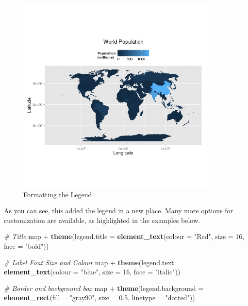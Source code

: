 \documentclass[]{article}
\newenvironment{Shaded}{}{}
\newcommand{\KeywordTok}[1]{\textcolor[rgb]{0.00,0.44,0.13}{\textbf{{#1}}}}
\newcommand{\DataTypeTok}[1]{\textcolor[rgb]{0.56,0.13,0.00}{{#1}}}
\newcommand{\DecValTok}[1]{\textcolor[rgb]{0.25,0.63,0.44}{{#1}}}
\newcommand{\FloatTok}[1]{\textcolor[rgb]{0.25,0.63,0.44}{{#1}}}
\newcommand{\StringTok}[1]{\textcolor[rgb]{0.25,0.44,0.63}{{#1}}}
\newcommand{\CommentTok}[1]{\textcolor[rgb]{0.38,0.63,0.69}{\textit{{#1}}}}
\newcommand{\NormalTok}[1]{{#1}}
\let\Oldincludegraphics\includegraphics
\renewcommand{\includegraphics}[1]{\Oldincludegraphics[width=10cm]{#1}}
\begin{document}
\begin{figure}[htbp]
\centering
\includegraphics{figure/Formatting_the_Legend.png}
\caption{Formatting the Legend}
\end{figure}

As you can see, this added the legend in a new place. Many more options
for customization are available, as highlighted in the examples below.

\begin{Shaded}
\begin{Highlighting}[]
\CommentTok{# Title}
\NormalTok{map + }\KeywordTok{theme}\NormalTok{(}\DataTypeTok{legend.title =} \KeywordTok{element_text}\NormalTok{(}\DataTypeTok{colour =} \StringTok{"Red"}\NormalTok{, }\DataTypeTok{size =} \DecValTok{16}\NormalTok{, }\DataTypeTok{face =} \StringTok{"bold"}\NormalTok{))}

\CommentTok{# Label Font Size and Colour}
\NormalTok{map + }\KeywordTok{theme}\NormalTok{(}\DataTypeTok{legend.text =} \KeywordTok{element_text}\NormalTok{(}\DataTypeTok{colour =} \StringTok{"blue"}\NormalTok{, }\DataTypeTok{size =} \DecValTok{16}\NormalTok{, }\DataTypeTok{face =} \StringTok{"italic"}\NormalTok{))}

\CommentTok{# Border and background box}
\NormalTok{map + }\KeywordTok{theme}\NormalTok{(}\DataTypeTok{legend.background =} \KeywordTok{element_rect}\NormalTok{(}\DataTypeTok{fill =} \StringTok{"gray90"}\NormalTok{, }\DataTypeTok{size =} \FloatTok{0.5}\NormalTok{, }\DataTypeTok{linetype =} \StringTok{"dotted"}\NormalTok{))}
\end{Highlighting}
\end{Shaded}
\end{document}
